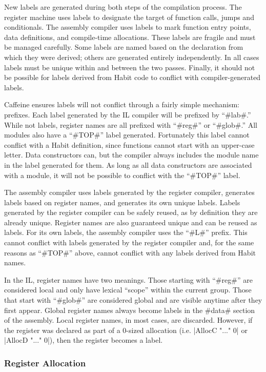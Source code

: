 \documentclass[11pt]{article}
\begin{document}
New labels are generated during both steps of the compilation
process. The register machine uses labels to designate the target of
function calls, jumps and conditionals. The assembly compiler uses
labels to mark function entry points, data definitions, and
compile-time allocations. These labels are fragile and must be managed
carefully. Some labels are named based on the declaration from which
they were derived; others are generated entirely independently. In all
cases labels must be unique within and between the two
passes. Finally, it should not be possible for labels derived from
Habit code to conflict with compiler-generated labels.

Caffeine ensures labels will not conflict through a fairly simple
mechanism: prefixes. Each label generated by the IL compiler will be
prefixed by ``#lab#.'' While not labels, register names are all
prefixed with ``#reg#'' or ``#glob#.'' All modules also have a
``#TOP#'' label generated. Fortunately this label cannot conflict
with a Habit definition, since functions cannot start with an
upper-case letter. Data constructors can, but the compiler always
includes the module name in the label generated for them. As long as
all data constructors are associated with a module, it will not be
possible to conflict with the ``#TOP#'' label.

The assembly compiler uses labels generated by the register compiler,
generates labels based on register names, and generates its
own unique labels. Labels generated by the register compiler can be
safely reused, as by definition they are already unique. Register
names are also guaranteed unique and can be reused as labels. For its
own labels, the assembly compiler uses the ``#L#'' prefix. This cannot
conflict with labels generated by the register compiler and, for the
same reasons as ``#TOP#'' above, cannot conflict with any labels
derived from Habit names.

In the IL, register names have two meanings. Those starting with
``#reg#'' are considered local and only have lexical ``scope'' within
the current group. Those that start with ``#glob#'' are considered
global and are visible anytime after they first appear. Global
register names always become labels in the #data# section of the
assembly. Local register names, in most cases, are discarded. However,
if the register was declared as part of a 0-sized allocation
(i.e. |AllocC "..." 0| or |AllocD "..." 0|), then the register becomes a
label.

\subsubsection{Register Allocation}
\end{document}
